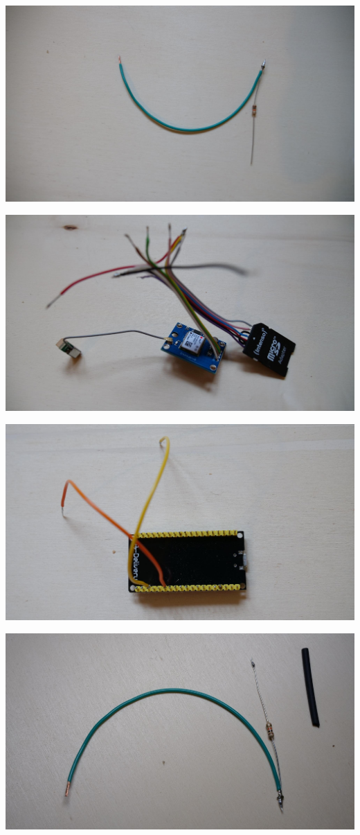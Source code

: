 \documentclass[
]{article}
\begin{document}
{\includegraphics{images/image16.jpg}}

{\includegraphics{images/image18.jpg}}

{\includegraphics{images/image1.jpg}}

{\includegraphics{images/image5.jpg}}
\end{document}
